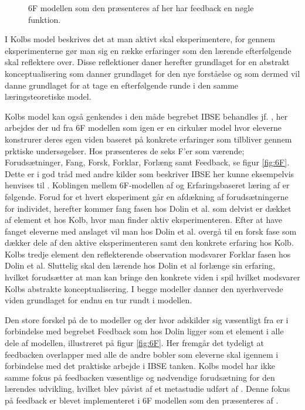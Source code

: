 \begin{figure}
	\centering
	\vspace{-20pt}
	\caption{6F modellen som den præsenteres af \citep{Dolin2014} her har feedback en nøgle funktion. }
	\label{fig:6F}
\vspace{-20pt}
\end{figure}
\noindent I Kolbs model beskrives det at man aktivt skal eksperimentere, for gennem eksperimenterne gør man sig en række erfaringer som den lærende efterfølgende skal reflektere over. Disse reflektioner daner herefter grundlaget for en abstrakt konceptualisering som danner grundlaget for den nye forståelse og som dermed vil danne grundlaget for at tage en efterfølgende runde i den samme læringsteoretiske model. 

Kolbs model kan også genkendes i den måde begrebet IBSE behandles jf. \citep{Dolin2014}, her arbejdes der ud fra 6F modellen som igen er en  cirkulær model hvor eleverne konstrurer deres egen viden baseret på konkrete erfaringer som tilbliver gennem prktiske undersøgelser. Hos \citet{Dolin2014} præsenteres de seks F'er som værende; Forudsætninger, Fang, Forsk, Forklar, Forlæng samt Feedback, se figur \vref{fig:6F}. Dette er i god tråd med andre kilder som beskriver IBSE her kunne eksempelvis henvises til \citep{Krogh2016}.
Koblingen mellem 6F-modellen af \citep{Dolin2014} og Erfaringsbaseret læring af \citep{Kolb1984} er følgende. Forud for et hvert eksperiment går en afdækning af forudsætningerne for individet, herefter kommer fang fasen hos Dolin et al. som delvist er dækket af element et hos Kolb, hvor man finder aktiv eksperimenteren. Efter at have fanget eleverne med anslaget vil man hos Dolin et al. overgå til en forsk fase som dækker dele af den aktive eksperimenteren samt den konkrete erfaring hos Kolb. Kolbs tredje element den reflekterende observation modsvarer Forklar fasen hos Dolin et al. Sluttelig skal den lærende hos Dolin et al forlænge sin erfaring, hvilket forudsætter at man kan bringe den konkrete viden i spil hvilket modsvarer Kolbs abstrakte konceptualisering. I begge modeller danner den nyerhvervede viden grundlaget for endnu en tur rundt i modellen.


Den store forskel på de to modeller og der hvor \citet{Dolin2014} adskilder sig væsentligt fra \citet{Kolb1984} er i forbindelse med begrebet Feedback som hos Dolin ligger som et element i alle dele af modellen, illustreret på figur \vref{fig:6F}. Her fremgår det tydeligt at feedbacken overlapper med alle de andre bobler som eleverne skal igennem i forbindelse med det praktiske arbejde i IBSE tanken. Kolbs model har ikke samme fokus på feedbacken væsentlige og nødvendige forudsætning for den lærendes udvikling, hvilket blev påvist af et metastudie udført af \citep{Hattie2015}. Denne fokus på feedback er blevet implementeret i 6F modellen som den præsenteres af \citep{Dolin2014}.

